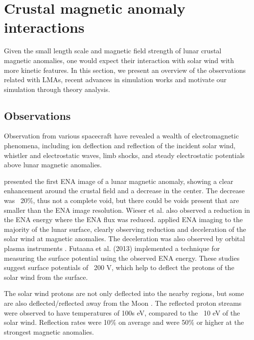 
\chapter{Crustal magnetic anomaly interactions}

Given the small length scale and magnetic field strength of lunar crustal magnetic anomalies, one would expect their interaction with solar wind with more kinetic features. In this section, we present an overview of the observations related with LMAs, recent advances in simulation works and motivate our simulation through theory analysis.

\section{Observations}
    
Observation from various spacecraft have revealed a wealth of electromagnetic phenomena, including ion deflection and reflection of the incident solar wind, whistler and electrostatic waves, limb shocks, and steady electrostatic potentials above lunar magnetic anomalies.

\cite{wieserFirstObservationMinimagnetosphere2010} presented the first ENA image of a lunar magnetic anomaly, showing a clear enhancement around the crustal field and a decrease in the center. The decrease was ~20\%, thus not a complete void, but there could be voids present that are smaller than the ENA image resolution. Wieser et al. also observed a reduction in the ENA energy where the ENA flux was reduced. \cite{vorburgerEnergeticNeutralAtom2013} applied ENA imaging to the majority of the lunar surface, clearly observing reduction and deceleration of the solar wind at magnetic anomalies. The deceleration was also observed by orbital plasma instruments \citep{saitoSimultaneousObservationElectron2012}. Futaana et al. (2013) implemented a technique for measuring the surface potential using the observed ENA energy. These studies suggest surface potentials of ~200 V, which help to deflect the protons of the solar wind from the surface.

The solar wind protons are not only deflected into the nearby regions, but some are also deflected/reflected away from the Moon \citep{saitoInflightPerformanceInitial2010}. The reflected proton streams were observed to have temperatures of 100s eV, compared to the ~10 eV of the solar wind. Reflection rates were 10\% on average and were 50\% or higher at the strongest magnetic anomalies. 

